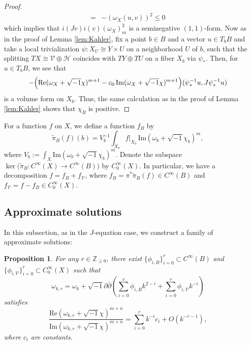 \documentclass{amsart}
\numberwithin{equation}{section}
\theoremstyle{plain}
\newtheorem{proposition}[equation]{Proposition}
\theoremstyle{definition}
\theoremstyle{remark}
\begin{document}
\begin{proof}
\begin{align*}
    =&-\left(\omega_X(u,v)\right)^2\le0
\end{align*}
which implies that $i(Jv)i(v)(\omega_X)^2_m$ is a seminegative $(1,1)$-form. Now as in the proof of Lemma \ref{lem:Kahler}, fix a point $b \in B$ and a vector $u \in T_bB$ and take a local trivialization $\psi: X_U \cong Y \times U$ on a neighborhood $U$ of $b$, such that the splitting $TX \cong \mathcal{V} \oplus \mathcal{H}$ coincides with $TY \oplus TU$ on a fiber $X_b$ via $\psi_*$. Then, for $u\in T_bB$, we see that
$$-\Bigl(\mathrm{Re}(\omega_X+\sqrt{-1}\chi)^{m+1}-c_0\,\mathrm{Im}(\omega_X+\sqrt{-1}\chi)^{m+1}\Bigr)(\psi^{-1}_*u,J\psi^{-1}_*u)$$
is a volume form on $X_b$. Thus, the same calculation as in the proof of Lemma \ref{lem:Kahler} shows that $\chi_B$ is positive.
\end{proof}

For a function $f$ on $X$, we define a function $f_B$ by
\begin{equation}\label{eq:pitilde}
    \tilde{\pi}_B(f)(b)=V_b^{-1}\int_{X_b}f|_{X_b}\, \mathrm{Im}(\omega_b+\sqrt{-1}\chi_b)^m,
\end{equation}
where $V_b:=\int_X\mathrm{Im}(\omega_b+\sqrt{-1}\chi_b)^m$.
Denote the subspace $\ker\bigl(\tilde{\pi}_B:C^\infty(X)\to C^\infty(B)\bigr)$ by $C^\infty_0(X)$. In particular, we have a decomposition $f=f_B+f_\mathcal{V}$, where $f_B=\pi^*\tilde{\pi}_B(f)\in C^\infty(B)$ and $f_\mathcal{V}=f-f_B\in C_0^\infty(X)$.

\subsection{Approximate solutions}
In this subsection, as in the $J$-equation case, we construct a family of approximate solutions:
\begin{proposition}\label{prop:dhymapp}
    For any $r\in\mathbb{Z}_{\ge0}$, there exist $\{\phi_{i,B}\}^r_{i=0}\subset C^\infty(B)$ and $\{\phi_{i,\mathcal{V}}\}^r_{i=0}\subset C^\infty_0(X)$ such that
    \begin{equation}\label{eq:dhymapp}
        \omega_{k, r} = \omega_k + \sqrt{-1} \partial \bar{\partial} \left( \sum_{i=0}^r \phi_{i, B} k^{2-i} + \sum_{i=0}^r \phi_{i, \mathcal{V}} k^{-i} \right)
    \end{equation}
    satisfies 
    $$\frac{\mathrm{Re}(\omega_{k,r}+\sqrt{-1}\chi)^{m+n}}{\mathrm{Im}(\omega_{k,r}+\sqrt{-1}\chi)^{m+n}}=\sum_{i=0}^r k^{-i} {c_i} + O \left(k^{-r-1} \right), $$
    where $ {c_i} $ are constants.
\end{proposition}
\end{document}

